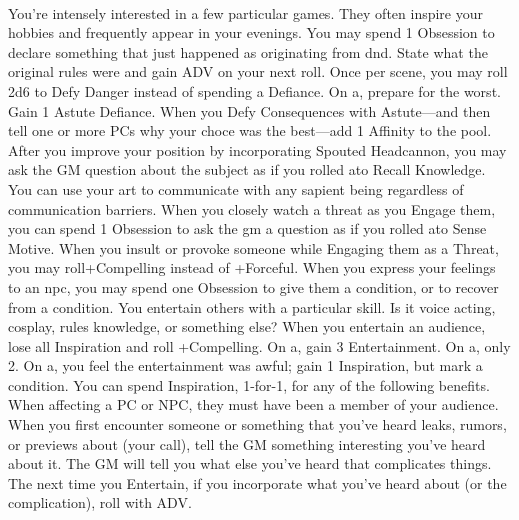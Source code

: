 \documentclass[darkmode]{dw2_playbook}
\begin{document}
\clearpage
~

\pageTwo
    {
      You're intensely interested in a few particular games. They often inspire your hobbies and frequently appear in your evenings.
    }
    {
          {
You may spend 1 Obsession to declare something that just happened as originating from dnd. State what the original rules were and gain ADV on your next roll.
        }
          {
Once per scene, you may roll 2d6 to Defy Danger instead of spending a Defiance.  On a\sixminus, prepare for the worst.
          }
          {
Gain 1 Astute Defiance. When you Defy Consequences with Astute—and then tell one or more PCs why your choce was the best—add 1 Affinity to the pool.
          }
          {
After you improve your position by incorporating Spouted Headcannon, you may ask the GM question about the subject as if you rolled a\tenplus to Recall Knowledge.
          }
          {
You can use your art to communicate with any sapient being regardless of communication barriers.
          }
          {
When you closely watch a threat as you Engage them, you can spend 1 Obsession to ask the gm a question as if you rolled a\tenplus to Sense Motive.
          }
          {
When you insult or provoke someone while Engaging them as a Threat, you may roll+Compelling instead of +Forceful.
          }
          {
When you express your feelings to an npc, you may spend one Obsession to give them a condition, or to recover from a condition.
          }
    }
    {
        {
          You entertain others with a particular skill. Is it voice acting, cosplay, rules knowledge, or something else? When you entertain an audience, lose all Inspiration and roll +Compelling. On a\tenplus, gain 3 Entertainment. On a\sevennine, only 2. On a\sixminus, you feel the entertainment was awful; gain 1 Inspiration, but mark a condition.
          \gap
          You can spend Inspiration, 1-for-1, for any of the following benefits. When affecting a PC or NPC, they must have been a member of your audience.
          \gap
        }
        \gap
        {
          When you first encounter someone or something that you’ve heard leaks, rumors, or previews about (your call), tell the GM something interesting you’ve heard about it. The GM will tell you what else you’ve heard that complicates things. The next time you Entertain, if you incorporate what you’ve heard about (or the complication), roll with ADV.
        }
    }
\end{document}

